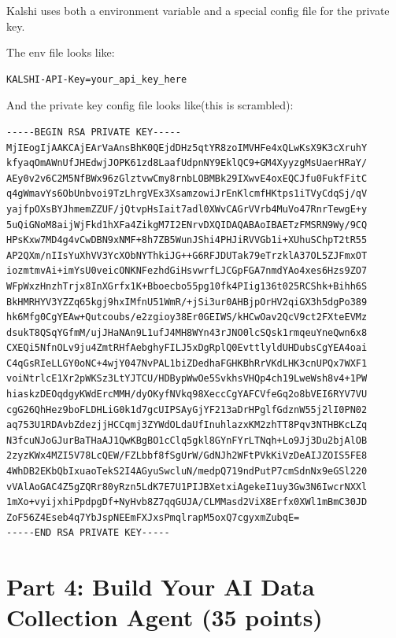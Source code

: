 \documentclass[12pt,a4paper]{article}
\begin{document}
Kalshi uses both a environment variable and a special config file for the private key.

The env file looks like:

\begin{verbatim}
KALSHI-API-Key=your_api_key_here
\end{verbatim}

And the private key config file looks like(this is scrambled):

\begin{verbatim}
-----BEGIN RSA PRIVATE KEY-----
MjIEogIjAAKCAjEArVaAnsBhK0QEjdDHz5qtYR8zoIMVHFe4xQLwKsX9K3cXruhY
kfyaqOmAWnUfJHEdwjJOPK61zd8LaafUdpnNY9EklQC9+GM4XyyzgMsUaerHRaY/
AEy0v2v6C2M5NfBWx96zGlztvwCmy8rnbLOBMBk29IXwvE4oxEQCJfu0FukfFitC
q4gWmavYs6ObUnbvoi9TzLhrgVEx3XsamzowiJrEnKlcmfHKtps1iTVyCdqSj/qV
yajfpOXsBYJhmemZZUF/jQtvpHsIait7adl0XWvCAGrVVrb4MuVo47RnrTewgE+y
5uQiGNoM8aijWjFkd1hXFa4ZikgM7I2ENrvDXQIDAQABAoIBAETzFMSRN9Wy/9CQ
HPsKxw7MD4g4vCwDBN9xNMF+8h7ZB5WunJShi4PHJiRVVGb1i+XUhuSChpT2tR55
AP2QXm/nIIsYuXhVV3YcXObNYThkiJG++G6RFJDUTak79eTrzklA37OL5ZJFmxOT
iozmtmvAi+imYsU0veicONKNFezhdGiHsvwrfLJCGpFGA7nmdYAo4xes6Hzs9ZO7
WFpWxzHnzhTrjx8InXGrfx1K+Bboecbo55pg10fk4PIig136t025RCShk+Bihh6S
BkHMRHYV3YZZq65kgj9hxIMfnU51WmR/+jSi3ur0AHBjpOrHV2qiGX3h5dgPo389
hk6Mfg0CgYEAw+Qutcoubs/e2zgioy38Er0GEIWS/kHCwOav2QcV9ct2FXteEVMz
dsukT8QSqYGfmM/ujJHaNAn9L1ufJ4MH8WYn43rJNO0lcSQsk1rmqeuYneQwn6x8
CXEQi5NfnOLv9ju4ZmtRHfAebghyFILJ5xDgRplQ0EvttlyldUHDubsCgYEA4oai
C4qGsRIeLLGY0oNC+4wjY047NvPAL1biZDedhaFGHKBhRrVKdLHK3cnUPQx7WXF1
voiNtrlcE1Xr2pWKSz3LtYJTCU/HDBypWwOe5SvkhsVHQp4ch19LweWsh8v4+1PW
hiaskzDEOqdgyKWdErcMMH/dyOKyfNVkq98XeccCgYAFCVfeGq2o8bVEI6RYV7VU
cgG26QhHez9boFLDHLiG0k1d7gcUIPSAyGjYF213aDrHPglfGdznW55j2lI0PN02
aq753U1RDAvbZdezjjHCCqmj3ZYWdOLdaUfInuhlazxKM2zhTT8Pqv3NTHBKcLZq
N3fcuNJoGJurBaTHaAJ1QwKBgBO1cClq5gkl8GYnFYrLTNqh+Lo9Jj3Du2bjAlOB
2zyzKWx4MZI5V78LcQEW/FZLbbf8fSgUrW/GdNJh2WFtPVkKiVzDeAIJZOIS5FE8
4WhDB2EKbQbIxuaoTekS2I4AGyuSwcluN/medpQ719ndPutP7cmSdnNx9eGSl220
vVAlAoGAC4Z5gZQRr80yRzn5LdK7E7U1PIJBXetxiAgekeI1uy3Gw3N6IwcrNXXl
1mXo+vyijxhiPpdpgDf+NyHvb8Z7qqGUJA/CLMMasd2ViX8Erfx0XWl1mBmC30JD
ZoF56Z4Eseb4q7YbJspNEEmFXJxsPmqlrapM5oxQ7cgyxmZubqE=
-----END RSA PRIVATE KEY-----
\end{verbatim}


\section{Part 4: Build Your AI Data Collection Agent (35 points)}
\end{document}
